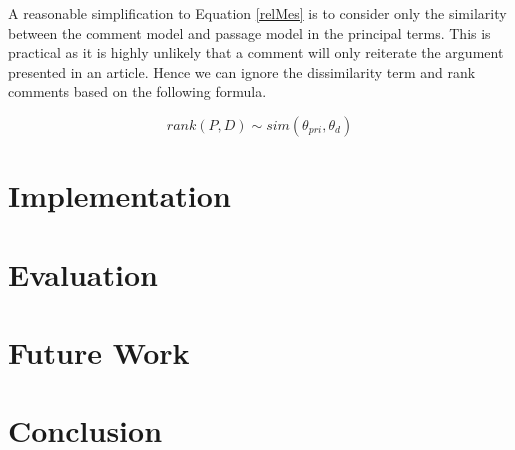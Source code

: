 \documentclass[article]{IEEEtran}
\begin{document}
A reasonable simplification to Equation \ref{relMes} is to consider only the similarity between the comment model and passage model in the principal terms. This is practical as it is highly unlikely that a comment will only reiterate the argument presented in an article. Hence we can ignore the dissimilarity term and rank comments based on the following formula.

\begin{equation}
rank(P,D) \sim sim(\theta_{pri}, \theta_d)
\end{equation} 

\section{Implementation}
\label{si}

\section{Evaluation}
\label{ev}

\section{Future Work}
\label{fw}
 
\section{Conclusion}
\label{con}

\nocite{titov2008modeling, ma2012topic, das2014going, blei2003modeling}

 
\end{document}
